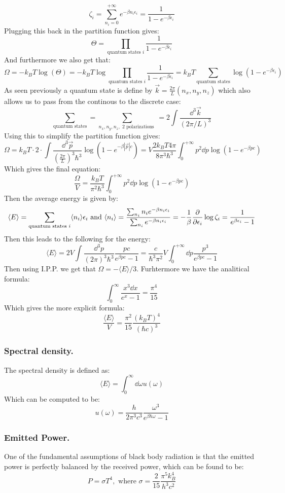 \documentclass[10pt,a4paper]{book}
\begin{document}
\[
\zeta_i = \sum_{n_i = 0}^{+\infty} e^{-\beta n_i \epsilon_i} = \frac{1}{1 - e^{-\beta \epsilon_i}}
\]
Plugging this back in the partition function gives:
\[
\Theta = \prod_{\text{quantum states } i} \frac{1}{1 - e^{-\beta \epsilon_i}}
\]
And furthermore we also get that:
\[
\Omega = - k_B T \log (\Theta) = - k_B T \log \prod_{\text{quantum states } i} \frac{1}{1 - e^{-\beta \epsilon_i}} = k_B T \sum_{\text{quantum states}} \log (1 - e^{-\beta \epsilon_i})
\]
As seen previously a quantum state is define by $\vec{k} = \frac{2 \pi}{L} (n_x, n_y, n_z)$ which also allows us to pass from the continous to the discrete case:
\[\sum_\text{quantum states} = \sum_{n_x, n_y, n_z, \text{ 2 polarizations } } = 2 \int \frac{\dd^3 \vec{k}}{(2\pi/ L)^3}
\]
Using this to simplify the partition function gives:
\[
\Omega = k_B T \cdot 2 \cdot \int \frac{\dd^3 \vec{p}}{(\frac{2\pi}{L})^3 \hbar^3} \log(1 - e^{-\beta |\vec{p}| c}) = V \frac{2 k_B T 4 \pi}{8 \pi^3 \hbar^3} \int_0^{+\infty}p^2 \dd p \log(1 - e^{-\beta p c})
\]
Which gives the final equation:
\[
\frac{\Omega}{V} = \frac{k_B T}{\pi^2 \hbar^3} \int_0^{+\infty} p^2 \dd p \log(1 - e^{-\beta p c})
\]
Then the average energy is given by:
\[
\langle E \rangle = \sum_{\text{quantum states } i} \langle n_i \rangle \epsilon_i \text{ and } \langle n_i \rangle = \frac{\sum_{n_i} n_i e^{-\beta n_i \epsilon_i}}{\sum_{n_i} e^{-\beta n_i \epsilon_i}} = -\frac{1}{\beta} \pdv{}{\epsilon_i} \log \zeta_i =  \frac{1}{e^{\beta \epsilon_i} - 1}
\]
Then this leads to the following for the energy:
\[
\langle E \rangle = 2 V \int \frac{\dd^3 p}{(2 \pi)^3 \hbar^3} \frac{pc}{e^{\beta pc} - 1} = \frac{c}{\hbar^3 \pi^2} V \int_0^{+\infty} \dd p \frac{p^3}{e^{\beta p c} - 1} 
\]
Then using I.P.P. we get that $\Omega = - \langle E \rangle / 3$. Furhtermore we have the analitical formula:
\[
\int_0^\infty \frac{x^3 \dd x} {e^x - 1} = \frac{\pi^4}{15}
\]
Which gives the more explicit formula:
\[
\frac{\langle E \rangle}{V} = \frac{\pi^2}{15} \frac{(k_B T)^4}{(\hbar c)^3}
\]
\subsubsection{Spectral density.}
The spectral density is defined as:
\[
\langle E \rangle = \int_0^\infty \dd \omega u(\omega)
\]
Which can be computed to be:
\[
u(\omega) = \frac{h}{2\pi^3 c^3} \frac{\omega^3}{e^{\beta \hbar \omega} - 1}
\]

\subsubsection{Emitted Power.}
One of the fundamental assumptions of black body radiation is that the emitted power is perfectly balanced by the received power, which can be found to be:
\[
P = \sigma T^4 , \text{ where } \sigma = \frac{2}{15} \frac{\pi^5 k_B^4}{h^3 c^2}
\]
\end{document}
